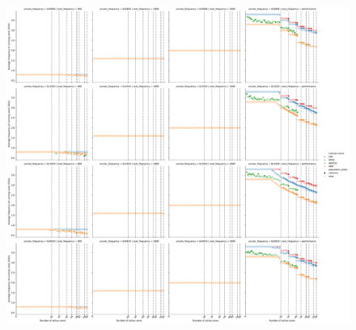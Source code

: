\begin{figure}[]
    \centering
    \includegraphics[width=\columnwidth]{fig/core-power-regulators-core-frequency.pdf}
\end{figure}

